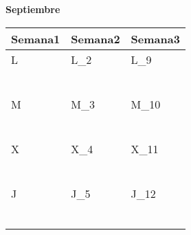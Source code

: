 \clearpage
{\raggedleft
	\fontsize{25}{50}\selectfont
	\textbf{Septiembre}\\
}


	\renewcommand{\arraystretch}{1.24}\scriptsize
	\begin{longtabu} to \textwidth { X[l] X[l] X[l]}
		\centering \textbf{Semana1} &  \centering\textbf{Semana2}  &   \centering\textbf{Semana3}  \\
		\toprule
		L & L_{2} & L_{9} \\
		  & \makebox{$\square$}\dotfill & \makebox{$\square$}\dotfill \\
		  & \dotfill & \dotfill \\
		  & \makebox{$\square$}\dotfill & \makebox{$\square$}\dotfill \\
		  & \dotfill & \dotfill \\
		  & \makebox{$\square$}\dotfill & \makebox{$\square$}\dotfill \\
		  & \dotfill & \dotfill \\

		\hline

		M & M_{3} & M_{10} \\
		  & \makebox{$\square$}\dotfill & \makebox{$\square$}\dotfill \\
		  & \dotfill & \dotfill \\
		  & \makebox{$\square$}\dotfill & \makebox{$\square$}\dotfill \\
		  & \dotfill & \dotfill \\
		  & \makebox{$\square$}\dotfill & \makebox{$\square$}\dotfill \\
		  & \dotfill & \dotfill \\

		\hline

		X & X_{4} & X_{11} \\
		  & \makebox{$\square$}\dotfill & \makebox{$\square$}\dotfill \\
		  & \dotfill & \dotfill \\
		  & \makebox{$\square$}\dotfill & \makebox{$\square$}\dotfill \\
		  & \dotfill & \dotfill \\
		  & \makebox{$\square$}\dotfill & \makebox{$\square$}\dotfill \\
		  & \dotfill & \dotfill \\

		\hline

		J & J_{5} & J_{12} \\
		  & \makebox{$\square$}\dotfill & \makebox{$\square$}\dotfill \\
		  & \dotfill & \dotfill \\
		  & \makebox{$\square$}\dotfill & \makebox{$\square$}\dotfill \\
		  & \dotfill & \dotfill \\
		  & \makebox{$\square$}\dotfill & \makebox{$\square$}\dotfill \\
		  & \dotfill & \dotfill \\


\end{longtabu}
